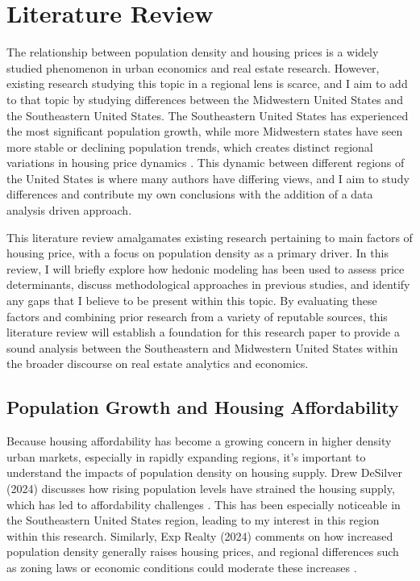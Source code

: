 \documentclass[journal,article,submit,pdftex,moreauthors]{Definitions/mdpi}
\begin{document}

\section{Literature Review}

The relationship between population density and housing prices is a widely studied phenomenon in urban economics and real estate research. However, existing research studying this topic in a regional lens is scarce, and I aim to add to that topic by studying differences between the Midwestern United States and the Southeastern United States. The Southeastern United States has experienced the most significant population growth, while more Midwestern states have seen more stable or declining population trends, which creates distinct regional variations in housing price dynamics \citep{_2024_net}. This dynamic between different regions of the United States is where many authors have differing views, and I aim to study differences and contribute my own conclusions with the addition of a data analysis driven approach.

This literature review amalgamates existing research pertaining to main factors of housing price, with a focus on population density as a primary driver. In this review, I will briefly explore how hedonic modeling has been used to assess price determinants, discuss methodological approaches in previous studies, and identify any gaps that I believe to be present within this topic. By evaluating these factors and combining prior research from a variety of reputable sources, this literature review will establish a foundation for this research paper to provide a sound analysis between the Southeastern and Midwestern United States within the broader discourse on real estate analytics and economics.

\subsection{Population Growth and Housing Affordability}

Because housing affordability has become a growing concern in higher density urban markets, especially in rapidly expanding regions, it’s important to understand the impacts of population density on housing supply. Drew DeSilver (2024) discusses how rising population levels have strained the housing supply, which has led to affordability challenges \citep{desilver2024}. This has been especially noticeable in the Southeastern United States region, leading to my interest in this region within this research. Similarly, Exp Realty (2024) comments on how increased population density generally raises housing prices, and regional differences such as zoning laws or economic conditions could moderate these increases \citep{a2024_how}.
\end{document}
